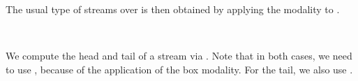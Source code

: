 The usual type of streams over  is then obtained by applying the  modality to  .
\begin{code}%
\>[0]\AgdaSpace{}%
\AgdaSymbol{:}\AgdaSpace{}%
\AgdaSpace{}%
\AgdaSpace{}%
\AgdaSpace{}%
\AgdaSpace{}%
\<%
\\
\>[0]\AgdaSpace{}%
\AgdaSpace{}%
\AgdaSymbol{=}\AgdaSpace{}%
\AgdaSpace{}%
\AgdaSymbol{(}\AgdaSpace{}%
\AgdaSymbol{)}\<%
\end{code}

We compute the head and tail of a stream via .
Note that in both cases, we need to use , because of the application of the box modality.
For the tail, we also use .

